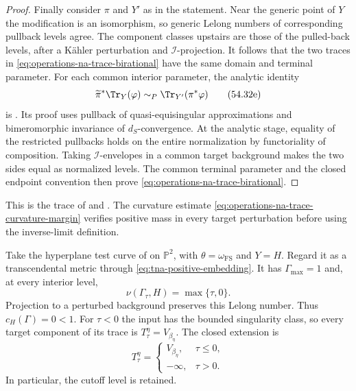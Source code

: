 \begin{proof}
Finally consider $\pi$ and $Y'$ as in the statement.
Near the generic point of $Y$ the modification is an isomorphism,
so generic Lelong numbers of corresponding pullback levels agree.
The component classes upstairs are those of the pulled-back
levels, after a K\"ahler perturbation and $\mathcal I$-projection.
It follows that the two traces in
\eqref{eq:operations-na-trace-birational} have the same domain
and terminal parameter.
For each common interior parameter, the analytic identity
\[
 \widetilde\pi^*\Tr_Y(\varphi)
 \sim_P\Tr_{Y'}(\pi^*\varphi)
\tag{54.32e}\label{eq:operations-na-trace-analytic-pullback}
\]
is \cite[Lemma~8.2.1]{XiaBook}.
Its proof uses pullback of quasi-equisingular approximations
and bimeromorphic invariance of $d_S$-convergence.
At the analytic stage, equality of the restricted pullbacks holds
on the entire normalization by functoriality of composition.
Taking $\mathcal I$-envelopes in a common target background makes
the two sides equal as normalized levels.
The common terminal parameter and the closed endpoint convention
then prove \eqref{eq:operations-na-trace-birational}.
\end{proof}

This is the trace of
\cite[Definitions~4.18 and 4.20, Section~4.8]{XiaOperationsV3}
and \cite[Definition~13.2.8 and Proposition~13.2.19]{XiaBook}.
The curvature estimate \eqref{eq:operations-na-trace-curvature-margin}
verifies positive mass in every target perturbation before using
the inverse-limit definition.

\begin{example}
\label{ex:operations-na-trace-cutoff}
Take the hyperplane test curve of
 on $\mathbb P^2$, with
$\theta=\omega_{\mathrm{FS}}$ and $Y=H$.
Regard it as a transcendental metric through
\eqref{eq:tna-positive-embedding}.
It has $\Gamma_{\max}=1$ and, at every interior level,
\[
 \nu(\Gamma_\tau,H)=\max\{\tau,0\}.
\]
Projection to a perturbed background preserves this Lelong number.
Thus $c_H(\Gamma)=0<1$.
For $\tau<0$ the input has the bounded singularity class, so every
target component of its trace is $T_\tau^\eta=V_{\beta_\eta}$.
The closed extension is
\[
 T_\tau^\eta=
 \begin{cases}
 V_{\beta_\eta},&\tau\leq0,\\
 -\infty,&\tau>0.
 \end{cases}
\tag{54.32f}\label{eq:operations-na-trace-cutoff-example}
\]
In particular, the cutoff level is retained.
\end{example}


